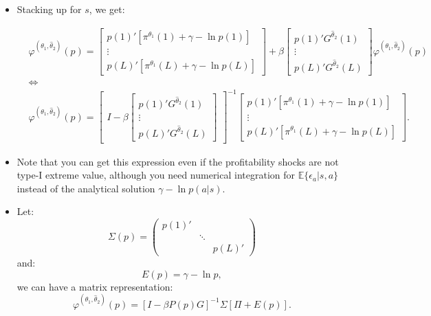 \documentclass[]{book}
\begin{document}
\begin{itemize}
\item
  Stacking up for \(s\), we get:

  \begin{equation}
  \begin{split}
  &\varphi^{(\theta_1, \hat{\theta}_2)}(p) =
  \begin{bmatrix}
  p(1)'[\pi^{\theta_1}(1) + \gamma - \ln p(1)]\\
  \vdots\\
  p(L)'[\pi^{\theta_1}(L) + \gamma - \ln p(L)]
  \end{bmatrix}
  +\beta
  \begin{bmatrix}
  p(1)' G^{\hat{\theta}_2}(1)\\
  \vdots\\
  p(L)' G^{\hat{\theta}_2}(L)
  \end{bmatrix}
  \varphi^{(\theta_1, \hat{\theta}_2)}(p)\\
  &\Leftrightarrow\\
  &\varphi^{(\theta_1, \hat{\theta}_2)}(p) = 
  \begin{bmatrix}
  I -
  \beta
  \begin{bmatrix}
  p(1)' G^{\hat{\theta}_2}(1)\\
  \vdots\\
  p(L)' G^{\hat{\theta}_2}(L)
  \end{bmatrix}
  \end{bmatrix}^{-1}
  \begin{bmatrix}
  p(1)'[\pi^{\theta_1}(1) + \gamma - \ln p(1)]\\
  \vdots\\
  p(L)'[\pi^{\theta_1}(L) + \gamma - \ln p(L)]
  \end{bmatrix}.
  \end{split}
  \end{equation}
\item
  Note that you can get this expression even if the profitability shocks
  are not type-I extreme value, although you need numerical integration
  for \(\mathbb{E}\{\epsilon_a|s, a\}\) instead of the analytical
  solution \(\gamma - \ln p(a|s)\).
\item
  Let: \[
  \Sigma(p) =
  \begin{pmatrix}
  p(1)' & & \\
   & \ddots & \\
   & & p(L)'
  \end{pmatrix}
  \] and: \[
  E(p) = 
  \gamma - \ln p,
  \] we can have a matrix representation: \[
  \varphi^{(\theta_1, \hat{\theta}_2)}(p) = [I - \beta P(p) G]^{-1}\Sigma[\Pi + E(p)].
  \]
\end{itemize}
\end{document}
